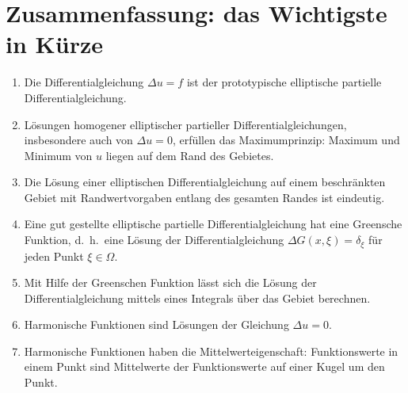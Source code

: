 \section{Zusammenfassung: das Wichtigste in Kürze}
\begin{enumerate}
\item Die Differentialgleichung $\Delta u=f$ ist der prototypische
elliptische partielle Differentialgleichung.
\item Lösungen homogener elliptischer partieller Differentialgleichungen,
insbesondere auch von $\Delta u=0$, erfüllen das Maximumprinzip:
Maximum und Minimum von $u$ liegen auf dem Rand des Gebietes.
\item Die Lösung einer elliptischen Differentialgleichung auf einem
beschränkten Gebiet mit Randwertvorgaben entlang des gesamten Randes
ist eindeutig.
\item Eine gut gestellte elliptische partielle Differentialgleichung hat
eine Greensche Funktion, d.~h.~eine Lösung der Differentialgleichung
$\Delta G(x,\xi)=\delta_\xi$ für jeden Punkt $\xi\in\Omega$.
\item Mit Hilfe der Greenschen Funktion lässt sich die Lösung
der Differentialgleichung mittels eines Integrals über das Gebiet
berechnen.
\item Harmonische Funktionen sind Lösungen der Gleichung $\Delta u=0$.
\item Harmonische Funktionen haben die Mittelwerteigenschaft: Funktionswerte
in einem Punkt sind Mittelwerte der Funktionswerte auf einer Kugel
um den Punkt.
\end{enumerate}


